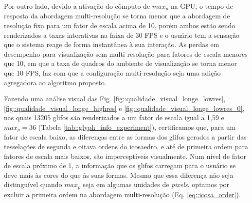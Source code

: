 Por outro lado, devido a ativação do cômputo de $max_p$ na GPU, o tempo de resposta da abordagem multi-resolução se torna menor que a abordagem de resolução fixa para um fator de escala acima de 10, porém ambos estão sendo renderizados a taxas interativas na faixa de 30 FPS \cite{nielsen1994} e o usuário tem a sensação que o sistema reage de forma instantânea à sua interação. As perdas em desempenho para visualização sem multi-resolução para fatores de escala menores que 10, em que a taxa de quadros do ambiente de visualização se torna menor que 10 FPS, faz com que a configuração multi-resolução seja uma adição agregadora ao algoritmo proposto.%

Fazendo uma análise visual das Fig. \ref{fig::qualidade_visual_longe_lowres},  \ref{fig::qualidade_visual_longe_highres} e \ref{fig::qualidade_visual_longe_lowres_0}, nas quais 13205 glifos são renderizados a um fator de escala igual a 1,59 e $max_p = 36$ (Tabela \ref{tab::glyph_info_experiment}), certificamos que, para um fator de escala baixo, as diferenças entre as formas dos glifos gerados a partir das tesselações de segunda e oitava ordens do icosaedro, e até de primeira ordem para fatores de escala mais baixos, são imperceptíveis visualmente. Num nível de fator de escala próximo de 1, a informação que os glifos carregam para o usuário se deve mais às cores do que às suas formas. Mesmo que essa diferença não seja distinguível quando $max_p$ seja em algumas unidades de \textit{pixels}, optamos por excluir a primeira ordem na abordagem multi-resolução (Eq. \ref{eq::icosa_order}).


